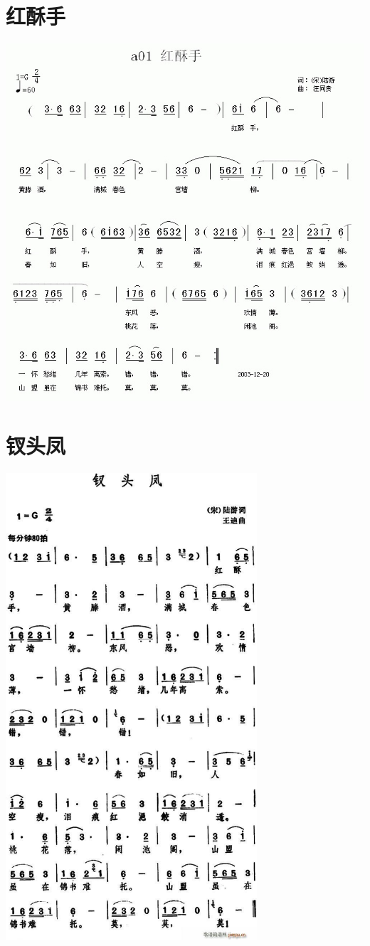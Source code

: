 \documentclass[cn,pad,twocol]{elegantbook}
\begin{document}
\section{红酥手}
    \includegraphics[width=\textwidth]{dongxiao/20200808-红酥手-陆游.jpg}
\section{钗头凤}
    \includegraphics[width=0.7\textwidth]{dongxiao/20200808-钗头凤-陆游.jpg}                             
\end{document}
